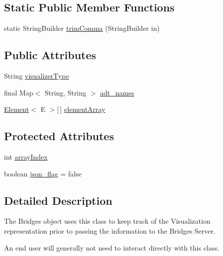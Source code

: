 \subsection*{Static Public Member Functions}
\begin{DoxyCompactItemize}
\item 
static String\+Builder \hyperlink{classbridges_1_1base_1_1_a_d_t_visualizer_af9ce115911ca745c6710b6faddfc0650}{trim\+Comma} (String\+Builder in)
\end{DoxyCompactItemize}
\subsection*{Public Attributes}
\begin{DoxyCompactItemize}
\item 
String \hyperlink{classbridges_1_1base_1_1_a_d_t_visualizer_a288aece657b5641f48e839b34f3884b9}{visualizer\+Type}
\item 
final Map$<$ String, String $>$ \hyperlink{classbridges_1_1base_1_1_a_d_t_visualizer_a6646d020143637569d607fa109c71ff9}{adt\+\_\+names}
\item 
\hyperlink{classbridges_1_1base_1_1_element}{Element}$<$ E $>$\mbox{[}$\,$\mbox{]} \hyperlink{classbridges_1_1base_1_1_a_d_t_visualizer_a320739b4be463d3987b3de2463b0d592}{element\+Array}
\end{DoxyCompactItemize}
\subsection*{Protected Attributes}
\begin{DoxyCompactItemize}
\item 
int \hyperlink{classbridges_1_1base_1_1_a_d_t_visualizer_a6304c4131e3e7eb5953402368b0e9e3c}{array\+Index}
\item 
boolean \hyperlink{classbridges_1_1base_1_1_a_d_t_visualizer_abf75be63a37f31ada7f92a84bb1bc536}{json\+\_\+flag} = false
\end{DoxyCompactItemize}


\subsection{Detailed Description}
The Bridges object uses this class to keep track of the Visualization representation prior to passing the information to the Bridges Server. 

An end user will generally not need to interact directly with this class. 

